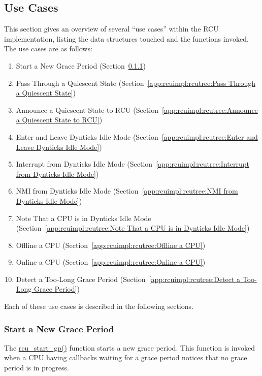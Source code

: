 \subsection{Use Cases}
\label{app:rcuimpl:rcutree:Use Cases}

This section gives an overview of several ``use cases''
within the RCU implementation, listing the data structures touched
and the functions invoked.
The use cases are as follows:

\begin{enumerate}
\item	Start a New Grace Period
	(Section~\ref{app:rcuimpl:rcutree:Start a New Grace Period})
\item	Pass Through a Quiescent State
	(Section~\ref{app:rcuimpl:rcutree:Pass Through a Quiescent State})
\item	Announce a Quiescent State to RCU
	(Section~\ref{app:rcuimpl:rcutree:Announce a Quiescent State to RCU})
\item	Enter and Leave Dynticks Idle Mode
	(Section~\ref{app:rcuimpl:rcutree:Enter and Leave Dynticks Idle Mode})
\item	Interrupt from Dynticks Idle Mode
	(Section~\ref{app:rcuimpl:rcutree:Interrupt from Dynticks Idle Mode})
\item	NMI from Dynticks Idle Mode
	(Section~\ref{app:rcuimpl:rcutree:NMI from Dynticks Idle Mode})
\item	Note That a CPU is in Dynticks Idle Mode
	(Section~\ref{app:rcuimpl:rcutree:Note That a CPU is in Dynticks Idle Mode})
\item	Offline a CPU
	(Section~\ref{app:rcuimpl:rcutree:Offline a CPU})
\item	Online a CPU
	(Section~\ref{app:rcuimpl:rcutree:Online a CPU})
\item	Detect a Too-Long Grace Period
	(Section~\ref{app:rcuimpl:rcutree:Detect a Too-Long Grace Period})
\end{enumerate}

Each of these use cases is described in the following sections.

\subsubsection{Start a New Grace Period}
\label{app:rcuimpl:rcutree:Start a New Grace Period}

The \url{rcu_start_gp()} function starts a new grace period.
This function is invoked when a CPU having callbacks waiting for a
grace period notices that no grace period is in progress.

